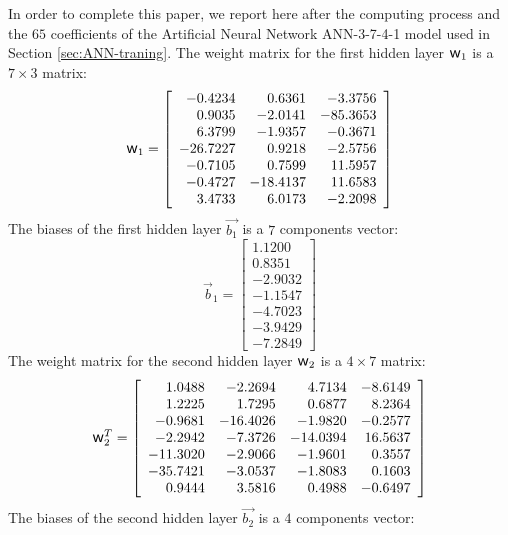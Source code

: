 \documentclass[algorithms,article,submit,pdftex,moreauthors]{Definitions/mdpi}
\DeclareRobustCommand{\w}{\mbox{\large\ensuremath{\mathsf{w}}}}
\begin{document}
In order to complete this paper, we report here after the computing process and the $65$ coefficients of the Artificial Neural Network ANN-3-7-4-1 model used in Section \ref{sec:ANN-traning}.
The weight matrix for the first hidden layer $\w_1$ is a $7\times3$ matrix:
\begin{equation*}
\w_1 = \left[
\begin{array}{rrr}
	-0.4234  & 0.6361   & -3.3756  \\
	0.9035   & -2.0141  & -85.3653 \\
	6.3799   & -1.9357  & -0.3671  \\
	-26.7227 & 0.9218   & -2.5756  \\
	-0.7105  & 0.7599   & 11.5957  \\
	-0.4727  & -18.4137 & 11.6583  \\
	3.4733   & 6.0173   & -2.2098
\end{array}\right]
\end{equation*}
The biases of the first hidden layer $\overrightarrow{b_1}$ is a $7$ components vector:
\begin{equation*}
\overrightarrow{b}_1 = \left[
\begin{array}{r}
	1.1200  \\
	0.8351  \\
	-2.9032 \\
	-1.1547 \\
	-4.7023 \\
	-3.9429 \\
	-7.2849
\end{array}\right]
\end{equation*}
The weight matrix for the second hidden layer $\w_2$ is a $4\times7$ matrix:
\begin{equation*}
\w_2^T = \left[
\begin{array}{rrrr}
	1.0488   & -2.2694  & 4.7134   & -8.6149 \\
	1.2225   & 1.7295   & 0.6877   & 8.2364  \\
	-0.9681  & -16.4026 & -1.9820  & -0.2577 \\
	-2.2942  & -7.3726  & -14.0394 & 16.5637 \\
	-11.3020 & -2.9066  & -1.9601  & 0.3557  \\
	-35.7421 & -3.0537  & -1.8083  & 0.1603  \\
	0.9444   & 3.5816   & 0.4988   & -0.6497
\end{array}\right]
\end{equation*}
The biases of the second hidden layer $\overrightarrow{b_2}$ is a $4$ components vector:
\end{document}
